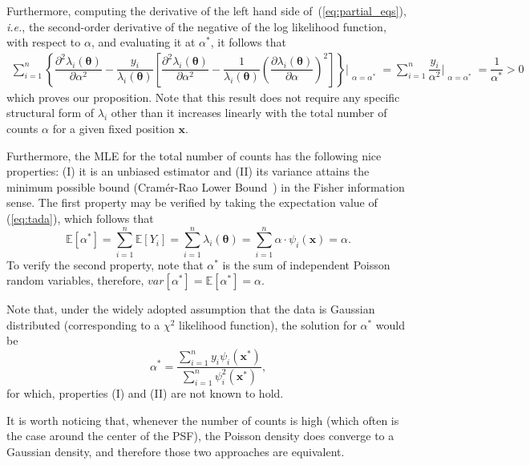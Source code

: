 \documentclass{rnaastex}
\begin{document}
Furthermore, computing the derivative of the left hand side of~(\ref{eq:partial_eqs}), \textit{i.e.},
the second-order derivative of the negative of the log likelihood function, with respect to $\alpha$,
and evaluating it at $\alpha^{*}$, it follows that
\begin{align}
    \sum_{i=1}^{n}\left\{\dfrac{\partial^2 \lambda_i\left(\bm{\theta}\right)}{\partial \alpha^2}
    - \dfrac{y_i}{\lambda_i\left(\bm{\theta}\right)}\left[\dfrac{\partial^2 \lambda_i
    \left(\bm{\theta}\right)}{\partial \alpha^2} - \dfrac{1}{\lambda_i\left(\bm{\theta}\right)}
    \left(\dfrac{\partial \lambda_i\left(\bm{\theta}\right)}{\partial \alpha}\right)^2\right]\right\}\Bigr|_{\substack{\alpha=\alpha^{*}}} = \sum_{i=1}^{n}\dfrac{y_i}{\alpha^2}\Bigr|_{\substack{\alpha=\alpha^{*}}} = \dfrac{1}{\alpha^{*}} > 0
    \label{eq:partial2_eqs}
\end{align}
which proves our proposition. Note that this result does not require any specific structural form of $\lambda_i$ other than it increases linearly with the total number of counts $\alpha$ for a given fixed position $\bm{x}$.

Furthermore, the MLE for the total number of counts has the following nice properties: (\textrm{I}) it is an unbiased estimator and (\textrm{II}) its variance attains the minimum possible bound (Cram\'er-Rao Lower Bound~\citep{bobrovsky:1987}) in the Fisher information sense. The first property may be verified by taking the expectation value of (\ref{eq:tada}), which follows that
\begin{equation}
    \mathbb{E}\left[\alpha^{*}\right] = \sum_{i=1}^{n}\mathbb{E}[Y_i] = \sum_{i=1}^{n} \lambda_i(\bm{\theta}) = \sum_{i=1}^{n} \alpha\cdot\psi_i(\bm{x}) = \alpha.
\end{equation}
To verify the second property, note that $\alpha^{*}$ is the sum of independent Poisson random variables, therefore, $var\left[\alpha^{*}\right] = \mathbb{E}\left[\alpha^{*}\right] = \alpha$.

Note that, under the widely adopted assumption that the data is Gaussian distributed (corresponding to a $\chi^2$ likelihood function), the solution for $\alpha^{*}$ would be
\begin{equation}
    \alpha^{*} = \dfrac{\sum_{i=1}^{n}y_i \psi_i(\bm{x}^{*})}{\sum_{i=1}^{n}\psi^2_i(\bm{x}^{*})},
\end{equation}
for which, properties (I) and (II) are not known to hold.

It is worth noticing that, whenever the number of counts is high (which often is the case around the center of the PSF), the Poisson density does converge to a Gaussian density, and therefore those two approaches are equivalent.
\end{document}
